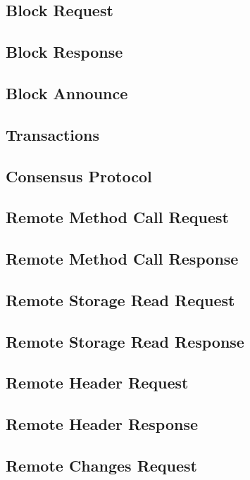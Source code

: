 \documentclass{book}
\begin{document}
\subsection{Block Request}

\subsection{Block Response}

\subsection{Block Announce}

\subsection{Transactions}

\subsection{Consensus Protocol}

\subsection{Remote Method Call Request}

\subsection{Remote Method Call Response}

\subsection{Remote Storage Read Request}

\subsection{Remote Storage Read Response}

\subsection{Remote Header Request}

\subsection{Remote Header Response}

\subsection{Remote Changes Request}
\end{document}
